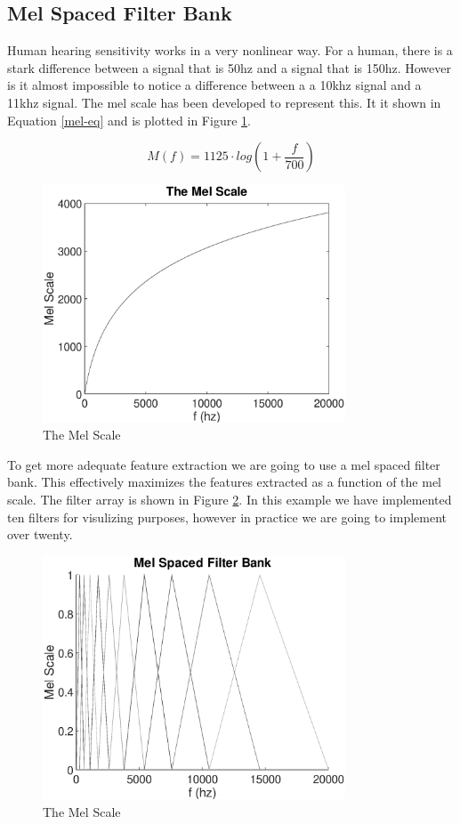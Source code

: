 \documentclass{article}
\begin{document}
\subsection{Mel Spaced Filter Bank}
Human hearing sensitivity works in a very nonlinear way. For a human, there is a stark difference between a signal that is 50hz and a signal that is 150hz. However is it almost impossible to notice a difference between a a 10khz signal and a 11khz signal. The mel scale has been developed to represent this. It it shown in Equation \ref{mel-eq} and is plotted in Figure \ref{mel}. 

\begin{equation}
M(f) = 1125 \cdot log(1+\frac{f}{700})
\label{mel-eq}
\end{equation}

\begin{figure}[h]
\centering
\includegraphics[width=9cm]{mel.eps}
\caption{The Mel Scale}
\label{mel}
\end{figure}

To get more adequate feature extraction we are going to use a mel spaced filter bank. This effectively maximizes the features extracted as a function of the mel scale. The filter array is shown in Figure \ref{FA}. In this example we have implemented ten filters for visulizing purposes, however in practice we are going to implement over twenty.

\begin{figure}[H]
\centering
\includegraphics[width=9cm]{FA.eps}
\caption{The Mel Scale}
\label{FA}
\end{figure}
\end{document}

